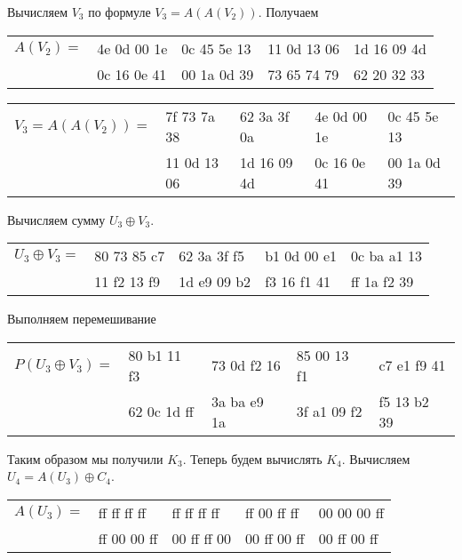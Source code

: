 \documentclass[10pt]{article}
\begin{document}
Вычисляем $V_3$ по формуле $V_3 = A(A(V_2))$. Получаем

\begin{center}
  \begin{tabular}{lllll}
    $A(V_2) =$ & 4e 0d 00 1e & 0c 45 5e 13 & 11 0d 13 06 & 1d 16 09 4d \\
               & 0c 16 0e 41 & 00 1a 0d 39 & 73 65 74 79 & 62 20 32 33 \\
  \end{tabular}
\end{center}

\begin{center}
  \begin{tabular}{lllll}
    $V_3=A(A(V_2)) =$ & 7f 73 7a 38 & 62 3a 3f 0a & 4e 0d 00 1e & 0c 45 5e 13 \\
                      & 11 0d 13 06 & 1d 16 09 4d & 0c 16 0e 41 & 00 1a 0d 39 \\
  \end{tabular}
\end{center}

Вычисляем сумму $U_3 \oplus V_3$.

\begin{center}
  \begin{tabular}{lllll}
    $U_3 \oplus V_3 =$ & 80 73 85 c7 & 62 3a 3f f5 & b1 0d 00 e1 & 0c ba a1 13 \\
                       & 11 f2 13 f9 & 1d e9 09 b2 & f3 16 f1 41 & ff 1a f2 39 \\
  \end{tabular}
\end{center}

Выполняем перемешивание

\begin{center}
  \begin{tabular}{lllll}
    $P(U_3 \oplus V_3) =$ & 80 b1 11 f3 & 73 0d f2 16 & 85 00 13 f1 & c7 e1 f9 41\\
                          & 62 0c 1d ff & 3a ba e9 1a & 3f a1 09 f2 & f5 13 b2 39 \\
  \end{tabular}
\end{center}

Таким образом мы получили $K_3$. Теперь будем вычислять $K_4$. Вычисляем $U_4 = A(U_3) \oplus C_4$.

\begin{center}
  \begin{tabular}{lllll}
    $A(U_3) =$ & ff ff ff ff & ff ff ff ff & ff 00 ff ff & 00 00 00 ff \\
               & ff 00 00 ff & 00 ff ff 00 & 00 ff 00 ff & 00 ff 00 ff \\
  \end{tabular}
\end{center}
\end{document}
